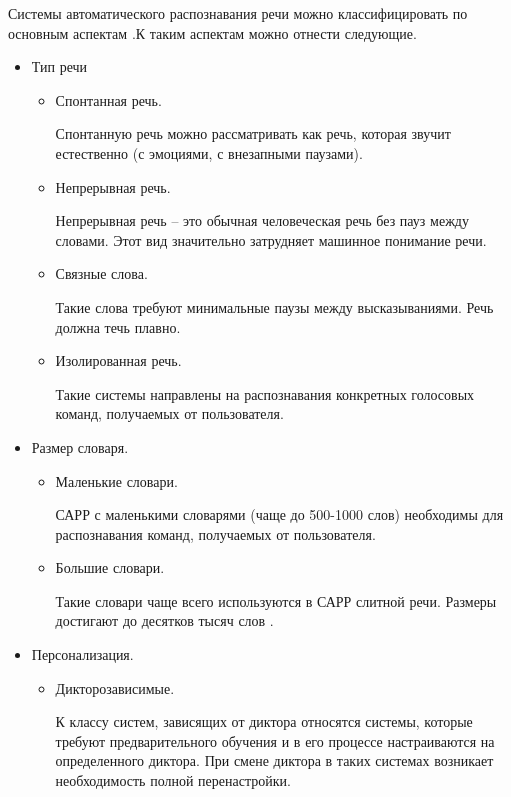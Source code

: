 Системы автоматического распознавания речи можно классифицировать по основным аспектам \cite{classif}.К таким аспектам можно отнести следующие. 
\begin{itemize}
	\item Тип речи
	\begin{itemize}
		\item Спонтанная речь.
		
		Спонтанную речь можно рассматривать как речь, которая звучит естественно (с эмоциями, с внезапными паузами).
		
		\item Непрерывная речь. 
		
		Непрерывная речь -- это обычная человеческая речь без пауз между словами. Этот вид значительно затрудняет машинное понимание речи.
		
		\item Связные слова.
		
		Такие слова требуют минимальные паузы между высказываниями. Речь должна течь плавно.
		
		\item Изолированная речь.
		
		Такие системы направлены на распознавания конкретных голосовых команд, получаемых от пользователя.
		
	\end{itemize}
	
	\item Размер словаря.
	\begin{itemize}
		\item Маленькие словари.
		
		САРР с маленькими словарями (чаще до 500-1000 слов) необходимы для распознавания команд, получаемых от пользователя.
		
		\item Большие словари.
		
		Такие словари чаще всего используются в САРР слитной речи. Размеры достигают до десятков тысяч слов \cite{babin}.
	\end{itemize}
	
	\item Персонализация.
	\begin{itemize}
		\item Дикторозависимые.
		
		К классу систем, зависящих от диктора относятся системы, которые требуют предварительного обучения и в его процессе настраиваются на определенного диктора. При смене диктора в таких системах возникает необходимость полной перенастройки. 
		

\end{itemize}
\end{itemize}
